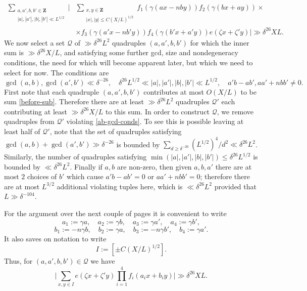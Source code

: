 \documentclass[11pt,reqno]{amsart}
\numberwithin{equation}{section}
\theoremstyle{definition}
\theoremstyle{remark}
\newcommand{\mc}{\mathcal}
\renewcommand{\le}{\leqslant}
\renewcommand{\ge}{\geqslant}
\newcommand\Z{\mathbf{Z}}
\begin{document}
\begin{align} \nonumber \sum_{ \substack{a,a',b,b' \in \Z \\ |a|, |a'|,|b|, |b'| \ll L^{1/2}}} \Big| & \sum_{\substack{x,y  \in \Z\\ |x|, |y| \le C(X/L)^{1/2}}} f_1(\gamma(ax - nby)) f_2(\gamma(bx + ay)) \times  \\ & \times f_3(\gamma(a'x - nb'y)) f_4(\gamma(b'x + a'y)) e(\zeta x + \zeta' y)  \Big| \gg \delta^{26} XL.\label{before-sub}\end{align}
We now select a set $\mc{Q}$ of $\gg \delta^{26} L^2$ quadruples $(a,a', b,b')$ for which the inner sum is $\gg \delta^{26} X/L$, and satisfying some further gcd, size and nondegeneracy conditions, the need for which will become apparent later, but which we need to select for now. The conditions are
\begin{equation}\label{ab-gcd-conds} \gcd(a, b), \gcd(a',b') \ll \delta^{-26}, \quad \delta^{26}L^{1/2} \ll |a|, |a'|, |b|, |b'| \ll L^{1/2}, \quad a'b - ab', aa' + n bb' \ne 0.
\end{equation}
First note that each quadruple $(a,a',b,b')$ contributes at most $O(X/L)$ to be sum \cref{before-sub}. Therefore there are at least $\gg \delta^{26}L^2$ quadruples $\mc{Q}'$ each contributing at least $\gg \delta^{26}X/L$ to this sum. In order to construct $\mc{Q}$, we remove quadruples from $\mc{Q}'$ violating \cref{ab-gcd-conds}. To see this is possible leaving at least half of $\mc{Q}'$, note that the set of quadruples satisfying $\gcd(a,b) + \gcd(a',b')\gg \delta^{-26}$ is bounded by $\sum_{d\ge \delta^{-26}}(L^{1/2})^4/d^2\ll \delta^{26}L^2$. Similarly, the number of quadruples satisfying $\min(|a|,|a'|,|b|,|b'|)\le \delta^{26}L^{1/2}$ is bounded by $\ll \delta^{26} L^{2}$. Finally if $a,b$ are non-zero, then given $a,b,a'$ there are at most $2$ choices of $b'$ which cause $a'b-ab' = 0$ or $aa' +nbb' = 0$; therefore there are at most $L^{3/2}$ additional violating tuples here, which is $\ll \delta^{26} L^2$ provided that $L\gg \delta^{-104}$.


For the argument over the next couple of pages it is convenient to write
\[ a_1 := \gamma a, \quad a_2 := \gamma b, \quad a_3 := \gamma a', \quad a_4 := \gamma b', \] \begin{equation}\label{oct-subs} b_1 := -n\gamma b, \quad b_2 := \gamma a , \quad  b_3 := -n\gamma b', \quad b_4 := \gamma a'.\end{equation} It also saves on notation to write
\begin{equation}\label{i-def} I := [\pm C(X/L)^{1/2}].\end{equation} Thus, for $(a, a', b, b') \in \mc{Q}$ we have
\begin{equation}\label{typii-4} \Big|\sum_{x,y \in I}e(\zeta x + \zeta' y) \prod_{i=1}^4 f_i(a_i x + b_i y)\Big| \gg \delta^{26} XL.\end{equation}
 
\end{document}

